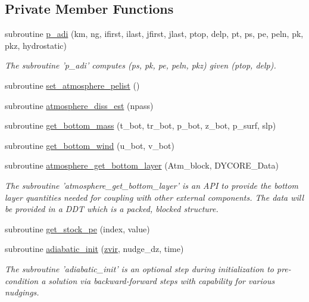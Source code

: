 \subsection*{Private Member Functions}
\begin{DoxyCompactItemize}
\item 
subroutine \hyperlink{classatmosphere__mod_aa742152443b418c81cda5ab32bf17f0e}{p\-\_\-adi} (km, ng, ifirst, ilast, jfirst, jlast, ptop, delp, pt, ps, pe, peln, pk, pkz, hydrostatic)
\begin{DoxyCompactList}\small\item\em The subroutine 'p\-\_\-adi' computes (ps, pk, pe, peln, pkz) given (ptop, delp). \end{DoxyCompactList}\item 
subroutine \hyperlink{classatmosphere__mod_a0b3f45bdf6f1f0ddb2260514fd3e8bb3}{set\-\_\-atmosphere\-\_\-pelist} ()
\item 
subroutine \hyperlink{classatmosphere__mod_a3afd17a79c9085897632f7298a0d29ab}{atmosphere\-\_\-diss\-\_\-est} (npass)
\item 
subroutine \hyperlink{classatmosphere__mod_a94122314f8c8e6209581bfacbbbf8319}{get\-\_\-bottom\-\_\-mass} (t\-\_\-bot, tr\-\_\-bot, p\-\_\-bot, z\-\_\-bot, p\-\_\-surf, slp)
\item 
subroutine \hyperlink{classatmosphere__mod_a18b993ba126ae2c1baa890234cfcb289}{get\-\_\-bottom\-\_\-wind} (u\-\_\-bot, v\-\_\-bot)
\item 
subroutine \hyperlink{classatmosphere__mod_a7f2735d36937c9db638ff80f70e8bbeb}{atmosphere\-\_\-get\-\_\-bottom\-\_\-layer} (Atm\-\_\-block, D\-Y\-C\-O\-R\-E\-\_\-\-Data)
\begin{DoxyCompactList}\small\item\em The subroutine 'atmosphere\-\_\-get\-\_\-bottom\-\_\-layer' is an A\-P\-I to provide the bottom layer quantities needed for coupling with other external components.  The data will be provided in a D\-D\-T which is a packed, blocked structure. \end{DoxyCompactList}\item 
subroutine \hyperlink{classatmosphere__mod_a2d856ff000261ca516c3ae653a9ef005}{get\-\_\-stock\-\_\-pe} (index, value)
\item 
subroutine \hyperlink{classatmosphere__mod_abd3fee5137633b7451c0ee1f29942e26}{adiabatic\-\_\-init} (\hyperlink{classatmosphere__mod_a313b4e35ea4020ee6ce916400b716e81}{zvir}, nudge\-\_\-dz, time)
\begin{DoxyCompactList}\small\item\em The subroutine 'adiabatic\-\_\-init' is an optional step during initialization to pre-\/condition a solution via backward-\/forward steps with capability for various nudgings. \end{DoxyCompactList}\end{DoxyCompactItemize}
